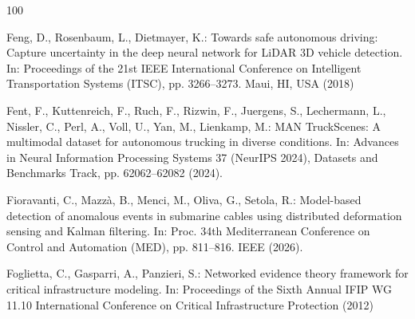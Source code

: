\documentclass[graybox,envcountchap]{style/SNmono}
\begin{document}
\begin{thebibliography}{100}
{\par}
{\color{red} 
Feng, D., Rosenbaum, L., Dietmayer, K.: Towards safe autonomous driving:
  Capture uncertainty in the deep neural network for {LiDAR} {3D} vehicle
  detection.
\newblock In: Proceedings of the 21st IEEE International Conference on
  Intelligent Transportation Systems (ITSC), pp. 3266--3273. Maui, HI, USA
  (2018)

\par}

Fent, F., Kuttenreich, F., Ruch, F., Rizwin, F., Juergens, S., Lechermann, L.,
  Nissler, C., Perl, A., Voll, U., Yan, M., Lienkamp, M.: {MAN TruckScenes}: A
  multimodal dataset for autonomous trucking in diverse conditions.
\newblock In: Advances in Neural Information Processing Systems 37 (NeurIPS
  2024), Datasets and Benchmarks Track, pp. 62062--62082 (2024).
\newblock {}



Fioravanti, C., Mazz{\`a}, B., Menci, M., Oliva, G., Setola, R.: Model-based
  detection of anomalous events in submarine cables using distributed
  deformation sensing and {K}alman filtering.
\newblock In: Proc. 34th Mediterranean Conference on Control and Automation
  (MED), pp. 811--816. IEEE (2026).
\newblock {}


{\color{red} 
Foglietta, C., Gasparri, A., Panzieri, S.: Networked evidence theory framework
  for critical infrastructure modeling.
\newblock In: Proceedings of the Sixth Annual IFIP WG 11.10 International
  Conference on Critical Infrastructure Protection (2012)

\par}
\end{thebibliography}
\end{document}
